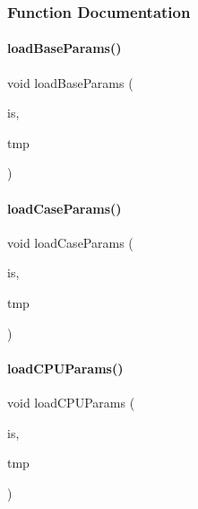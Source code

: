 \subsubsection{Function Documentation}
\mbox{\label{_inventory_8h_af88785d286c8ea9392930b904f687672}} 
\paragraph{\texorpdfstring{loadBaseParams()}{loadBaseParams()}}
{\footnotesize\ttfamily void load\+Base\+Params (\begin{DoxyParamCaption}\item[{std\+::istream \&}]{is,  }\item[{\mbox{\hyperlink{struct_temp_input}{Temp\+Input}} \&}]{tmp }\end{DoxyParamCaption})}

\mbox{\label{_inventory_8h_a47e65a05879001febd45f541ab230b86}} 
\paragraph{\texorpdfstring{loadCaseParams()}{loadCaseParams()}}
{\footnotesize\ttfamily void load\+Case\+Params (\begin{DoxyParamCaption}\item[{std\+::istream \&}]{is,  }\item[{\mbox{\hyperlink{struct_temp_input}{Temp\+Input}} \&}]{tmp }\end{DoxyParamCaption})}

\mbox{\label{_inventory_8h_a0565beb9b5429fe7cf6edcb88becc168}} 
\paragraph{\texorpdfstring{loadCPUParams()}{loadCPUParams()}}
{\footnotesize\ttfamily void load\+C\+P\+U\+Params (\begin{DoxyParamCaption}\item[{std\+::istream \&}]{is,  }\item[{\mbox{\hyperlink{struct_temp_input}{Temp\+Input}} \&}]{tmp }\end{DoxyParamCaption})}

